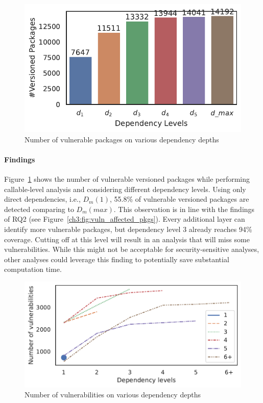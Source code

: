 \begin{figure}
\includegraphics[width=0.8\columnwidth]{chapters/ch3/figs/pkg_num_dep_level.pdf}
    \caption{Number of vulnerable packages on various dependency depths}
    \label{ch3:fig:num_vuln_pkg_d_levels}
\end{figure}

\paragraph{Findings}
Figure~\ref{ch3:fig:num_vuln_pkg_d_levels} shows the number of vulnerable versioned packages while performing callable-level analysis and considering different dependency levels. Using only direct dependencies, i.e., $D_{m}(1)$, 55.8\% of vulnerable versioned packages are detected comparing to $D_m(max)$. This observation is in line with the findings of RQ2 (see Figure~\ref{ch3:fig:vuln_affected_pkgs}).
Every additional layer can identify more vulnerable packages, but dependency level 3 already reaches 94\% coverage.
Cutting off at this level will result in an analysis that will miss some vulnerabilities.
While this might not be acceptable for security-sensitive analyses, other analyses could leverage this finding to potentially save substantial computation time.

\begin{figure}
    \includegraphics[width=0.8\linewidth]{chapters/ch3/figs/num_vuln_dep_levels.pdf}
    \caption{Number of vulnerabilities on various dependency depths}
    \label{ch3:fig:num_vuln_dep_levels}
\end{figure}

